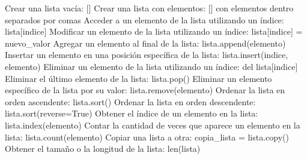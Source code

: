 Crear una lista vacía: []
Crear una lista con elementos: [] con elementos dentro separados por comas
Acceder a un elemento de la lista utilizando un índice: lista[indice]
Modificar un elemento de la lista utilizando un índice: lista[indice] = nuevo_valor
Agregar un elemento al final de la lista: lista.append(elemento)
Insertar un elemento en una posición específica de la lista: lista.insert(indice, elemento)
Eliminar un elemento de la lista utilizando un índice: del lista[indice]
Eliminar el último elemento de la lista: lista.pop()
Eliminar un elemento específico de la lista por su valor: lista.remove(elemento)
Ordenar la lista en orden ascendente: lista.sort()
Ordenar la lista en orden descendente: lista.sort(reverse=True)
Obtener el índice de un elemento en la lista: lista.index(elemento)
Contar la cantidad de veces que aparece un elemento en la lista: lista.count(elemento)
Copiar una lista a otra: copia_lista = lista.copy()
Obtener el tamaño o la longitud de la lista: len(lista)